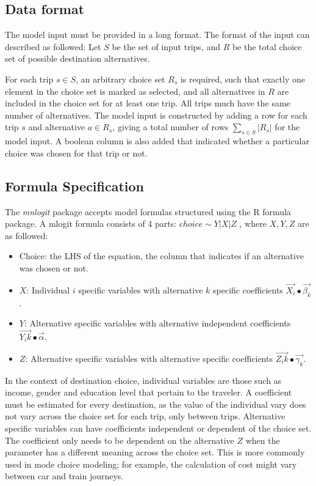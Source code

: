 \subsection*{Data format}
The model input must be provided in a long format. The format of the input can described as followed:
Let \(S\)  be the set of input trips, and \(R\)  be the total choice set of possible destination alternatives. 

For each trip $s \in S$, an arbitrary choice set $R_s$ is required, such that exactly one element in the choice set is marked as selected, and all alternatives in $R$ are included in the choice set for at least one trip. All trips much have the same number of alternatives.
The model input is constructed by adding a row for each trip $s$ and alternative $a \in R_s$, giving a total number of rows  $ \sum_{s \in S} |R_s| $  for the model input. A boolean column is also added that indicated whether a particular choice was chosen for that trip or not.

\subsection*{Formula Specification}
The \textit{mnlogit} package accepts model formulas structured using the R formula package. A mlogit formula consists of 4 parts: $ choice \sim Y | X | Z $ , where $X,Y,Z$ are as followed:

\begin{itemize}
	\item Choice: the LHS of the equation, the column that indicates if an alternative was chosen or not.
	\item $X$: Individual $i$ specific variables with alternative $k$ specific coefficients $\vec{X_i} ∙\vec{\beta_k}$.

	\item $Y$: Alternative specific variables with alternative independent coefficients $\vec{Y_ik} ∙\vec{\alpha}$. 
	\item $Z$: Alternative specific variables with alternative specific coefficients
$\vec{Z_ik} ∙\vec{\gamma_k}$.
\end{itemize}

In the context of destination choice, individual variables are those such as income, gender and education level that pertain to the traveler. A coefficient must be estimated for every destination, as the value of the individual vary does not vary across the choice set for each trip, only between trips. Alternative specific variables can have coefficients independent or dependent of the choice set. The coefficient only needs to be dependent on the alternative $Z$ when the parameter has a different meaning across the choice set. This is more commonly used in mode choice modeling; for example, the calculation of cost might vary between car and train journeys.

